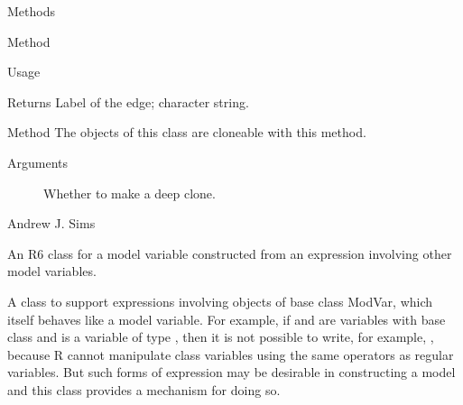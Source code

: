 \documentclass[a4paper]{book}
\begin{document}
\begin{Section}{Methods}
\begin{SubSection}{Method }
\begin{SubSubSection}{Usage}
\end{SubSubSection}


%
\begin{SubSubSection}{Returns}
Label of the edge; character string.
\end{SubSubSection}

\end{SubSection}



\hypertarget{method-clone}{}
%
\begin{SubSection}{Method }
The objects of this class are cloneable with this method.
%


%
\begin{SubSubSection}{Arguments}

\begin{description}

\item[] Whether to make a deep clone.

\end{description}


\end{SubSubSection}

\end{SubSection}

\end{Section}
%
\begin{Author}\relax
Andrew J. Sims 
\end{Author}
%
\begin{Description}\relax
An R6 class for a model variable constructed from an expression
involving other model variables.
\end{Description}
%
\begin{Details}\relax
A class to support expressions involving objects
of base class ModVar, which itself behaves like a 
model variable. For example, if  and
 are variables with base class 
and  is a variable of type , then
it is not possible to write, for example, 
, because R cannot manipulate class
variables using the same operators as regular variables. 
But such forms of expression may be desirable in constructing a
model and this class provides a mechanism for doing so.
\end{Details}
\end{document}
